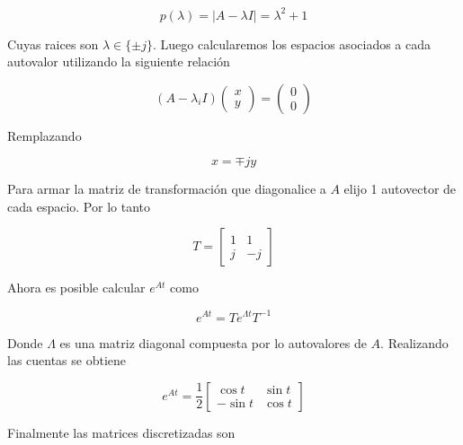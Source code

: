 \documentclass{article}
\begin{document}
    \begin{equation}
        p(\lambda) = |A-\lambda I| = \lambda^2 + 1
    \end{equation}

    Cuyas raices son $\lambda \in \{ \pm j \}$. Luego calcularemos los espacios asociados a cada autovalor utilizando la siguiente relación 

    \begin{equation}
        (A-\lambda_i I) 
        \begin{pmatrix}
            x \\ y    
        \end{pmatrix}
        = 
        \begin{pmatrix}
            0 \\ 0
        \end{pmatrix}
    \end{equation}

    Remplazando 

    \begin{equation}
        x = \mp j y
    \end{equation}

    Para armar la matriz de transformación que diagonalice a $A$ elijo 1 autovector de cada espacio. Por lo tanto

    \begin{equation}
        T = \begin{bmatrix}
            1 & 1 \\
            j & -j
        \end{bmatrix}
    \end{equation}

    Ahora es posible calcular $e^{At}$ como 

    \begin{equation}
        e^{At} = T e^{\Lambda t} T^{-1}
    \end{equation}

    Donde $\Lambda$ es una matriz diagonal compuesta por lo autovalores de $A$. Realizando las cuentas se obtiene 

    \begin{equation}
        e^{At} = \frac{1}{2} 
        \begin{bmatrix}
            \cos{t} & \sin{t} \\ 
            -\sin{t} & \cos{t} 
        \end{bmatrix}
    \end{equation}

    Finalmente las matrices discretizadas son 
\end{document}
